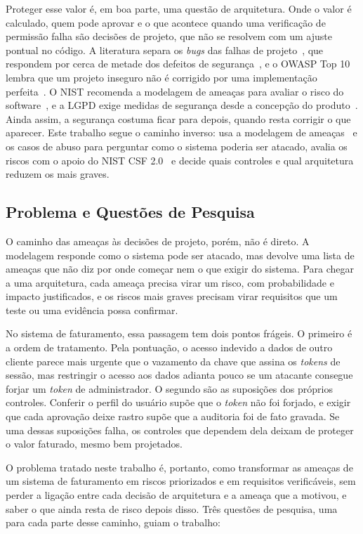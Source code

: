 \documentclass[conference]{IEEEtran}
\begin{document}
Proteger esse valor é, em boa parte, uma questão de arquitetura. Onde o valor é calculado, quem pode aprovar e o que acontece quando uma verificação de permissão falha são decisões de projeto, que não se resolvem com um ajuste pontual no código. A literatura separa os \textit{bugs} das falhas de projeto~\cite{arce2014}, que respondem por cerca de metade dos defeitos de segurança~\cite{mcgraw2006}, e o OWASP Top 10 lembra que um projeto inseguro não é corrigido por uma implementação perfeita~\cite{owasp2025a06}. O NIST recomenda a modelagem de ameaças para avaliar o risco do software~\cite{nist2022ssdf}, e a LGPD exige medidas de segurança desde a concepção do produto~\cite{lgpd2018}. Ainda assim, a segurança costuma ficar para depois, quando resta corrigir o que aparecer. Este trabalho segue o caminho inverso: usa a modelagem de ameaças~\cite{shostack2014} e os casos de abuso para perguntar como o sistema poderia ser atacado, avalia os riscos com o apoio do NIST CSF 2.0~\cite{nist2024csf} e decide quais controles e qual arquitetura reduzem os mais graves.

\subsection{Problema e Questões de Pesquisa}

O caminho das ameaças às decisões de projeto, porém, não é direto. A modelagem responde como o sistema pode ser atacado, mas devolve uma lista de ameaças que não diz por onde começar nem o que exigir do sistema. Para chegar a uma arquitetura, cada ameaça precisa virar um risco, com probabilidade e impacto justificados, e os riscos mais graves precisam virar requisitos que um teste ou uma evidência possa confirmar. 

No sistema de faturamento, essa passagem tem dois pontos frágeis. O primeiro é a ordem de tratamento. Pela pontuação, o acesso indevido a dados de outro cliente parece mais urgente que o vazamento da chave que assina os \textit{tokens} de sessão, mas restringir o acesso aos dados adianta pouco se um atacante consegue forjar um \textit{token} de administrador. O segundo são as suposições dos próprios controles. Conferir o perfil do usuário supõe que o \textit{token} não foi forjado, e exigir que cada aprovação deixe rastro supõe que a auditoria foi de fato gravada. Se uma dessas suposições falha, os controles que dependem dela deixam de proteger o valor faturado, mesmo bem projetados.

O problema tratado neste trabalho é, portanto, como transformar as ameaças de um sistema de faturamento em riscos priorizados e em requisitos verificáveis, sem perder a ligação entre cada decisão de arquitetura e a ameaça que a motivou, e saber o que ainda resta de risco depois disso. Três questões de pesquisa, uma para cada parte desse caminho, guiam o trabalho:
\end{document}
